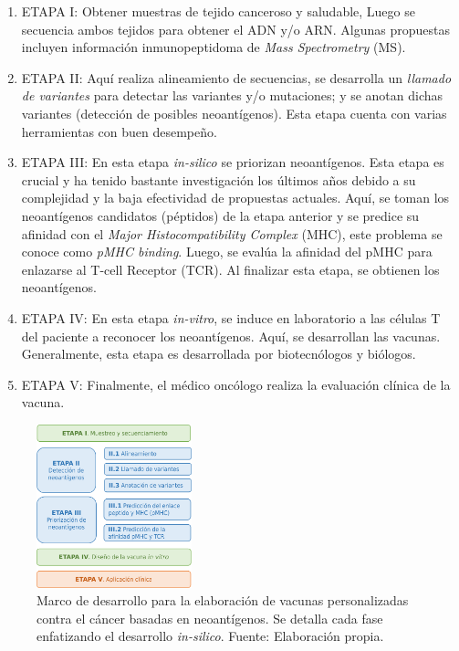\documentclass[a4paper,11pt]{article}
\begin{document}
	
	
	
	\begin{enumerate}
		\item ETAPA I: Obtener muestras de tejido canceroso y saludable, Luego se secuencia ambos tejidos para obtener el ADN y/o ARN. Algunas propuestas incluyen información inmunopeptidoma de \textit{Mass Spectrometry} (MS).
		\item ETAPA II: Aquí realiza alineamiento de secuencias, se desarrolla un \textit{llamado de variantes} para detectar las variantes y/o mutaciones; y se anotan dichas variantes (detección de posibles neoantígenos). Esta etapa cuenta con varias herramientas con buen desempeño.
		\item ETAPA III: En esta etapa \textit{in-silico} se priorizan neoantígenos. Esta etapa es crucial y ha tenido bastante investigación los últimos años debido a su complejidad y la baja efectividad de propuestas actuales. Aquí, se toman los neoantígenos candidatos (péptidos) de la etapa anterior y se predice su afinidad con el \textit{Major Histocompatibility Complex} (MHC), este problema se conoce como \textit{pMHC binding}. Luego, se  evalúa la afinidad del pMHC para enlazarse al T-cell Receptor (TCR). Al finalizar esta etapa, se obtienen los neoantígenos.
		\item ETAPA IV: En esta etapa \textit{in-vitro}, se induce en laboratorio  a las células T del paciente a reconocer los neoantígenos. Aquí, se desarrollan las vacunas. Generalmente, esta etapa es desarrollada por biotecnólogos y biólogos.
		\item ETAPA V: Finalmente, el médico oncólogo realiza la evaluación clínica de la vacuna.
	\end{enumerate}
	
	
	
	
	
	
	


\begin{figure}[h]	
		\centering
		\includegraphics[width=0.4\textwidth]{../img/vaccines/pipeline2}	
	\caption{Marco de desarrollo para la elaboración de vacunas personalizadas contra el cáncer basadas en neoantígenos. Se detalla cada fase enfatizando el desarrollo \textit{in-silico}. Fuente: Elaboración propia.}
	\label{fig:vaccines}
\end{figure}
	
\end{document}
